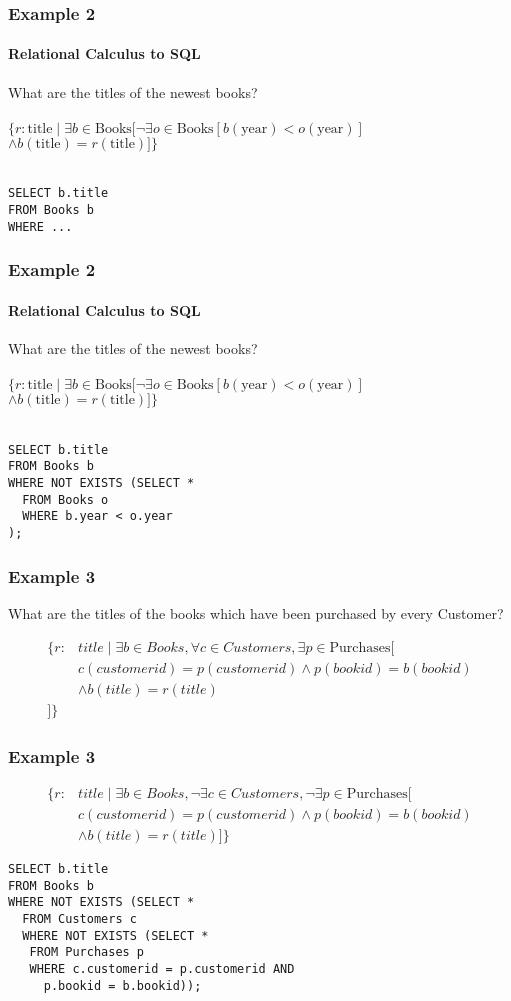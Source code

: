 \documentclass{beamer}
\begin{document}
\begin{frame}[fragile]
  \frametitle{Example 2}
    \framesubtitle{Relational Calculus to SQL}
  What are the titles of the newest books?\\
  \hfill \\
  $\{r:\text{title} \mid \exists b \in \text{Books} [ \neg\exists o \in \text{Books} [ b(\text{year}) < o(\text{year})]$\\
  $\land b(\text{title}) = r(\text{title})] \}$\\
  \hfill \\
\begin{lstlisting}
SELECT b.title
FROM Books b
WHERE ...
\end{lstlisting}
\end{frame}

\begin{frame}[fragile]
  \frametitle{Example 2}
    \framesubtitle{Relational Calculus to SQL}
  What are the titles of the newest books?\\
  \hfill \\
  $\{r:\text{title} \mid \exists b \in \text{Books} [ \neg\exists o \in \text{Books} [ b(\text{year}) < o(\text{year})]$\\
  $\land b(\text{title}) = r(\text{title})] \}$\\
  \hfill \\
\begin{lstlisting}
SELECT b.title
FROM Books b
WHERE NOT EXISTS (SELECT *
  FROM Books o
  WHERE b.year < o.year
);
\end{lstlisting}
\end{frame}

\begin{frame}[fragile]
\frametitle{Example 3}
What are the titles of the books which have been purchased by every Customer?

\begin{align*}
\{r:&title \mid \exists b \in Books, \forall c \in Customers, \exists p \in \text{Purchases} [\\
  &c(customerid) = p(customerid) \land  p(bookid) = b(bookid) \\
  &\land b(title) = r(title)\\
]\}
\end{align*}

\end{frame}

\begin{frame}[fragile]
\frametitle{Example 3}
\begin{align*}
\{r:&title \mid \exists b \in Books, \neg \exists c \in Customers, \neg \exists p \in \text{Purchases} [\\
  &c(customerid) = p(customerid) \land  p(bookid) = b(bookid) \\
  &\land b(title) = r(title)]\}
\end{align*}
\begin{lstlisting}
SELECT b.title
FROM Books b
WHERE NOT EXISTS (SELECT *
  FROM Customers c
  WHERE NOT EXISTS (SELECT *
   FROM Purchases p
   WHERE c.customerid = p.customerid AND
     p.bookid = b.bookid));
\end{lstlisting}
\end{frame}
\end{document}
